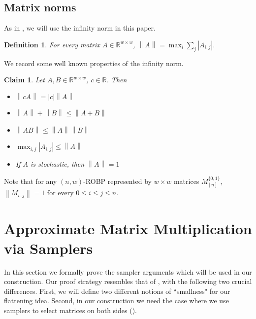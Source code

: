 \documentclass[10pt,a4paper]{article}
\newtheorem{definition}[theorem]{Definition}
\newtheorem{claim}[theorem]{Claim}
\newcommand{\norm}[2][]{\left\|#2\right\|_{#1}}
\newcommand{\bbR}{\mathbb R}
\newcommand{\bit}{\{0,1\}}
\newcommand{\ninf}{\norm}
\begin{document}
\subsection{Matrix norms}
As in \cite{BCG18}, we will use the infinity norm in this paper.
\begin{definition}
For every matrix $A\in\bbR^{w\times w}$, $\ninf{A}=\max_i{\sum_j |A_{i,j}|}$.
\end{definition}
We record some well known properties of the infinity norm.
\begin{claim}
Let $A,B\in\bbR^{w\times w}$, $c\in \bbR$. Then
\begin{itemize}
\item
$\norm{cA}=|c|\norm{A}$
\item
$\norm{A}+\norm{B}\le\norm{A+B}$
\item
$\ninf{AB}\le \ninf{A}\ninf{B}$ 
\item
 $\max_{i,j} |A_{i,j}|\le\ninf{A}$
\item
If $A$ is stochastic, then $\ninf{A}=1$
\end{itemize}
\end{claim}
Note that for any $(n,w)$-ROBP represented by $w\times w$ matrices $M_{[n]}^{\bit}$, $\ninf{M_{i..j}}=1$ for every $0\le i\le j\le n$.


\section{Approximate Matrix Multiplication via Samplers}\label{sec:samp-our}




In this section we formally prove the sampler arguments which will be used in our construction. Our proof strategy resembles that of \cite{BCG18},  with the following two crucial differences. First, we will define two different notions of ``smallness" for our flattening idea. Second, in our construction we need the case where we use samplers to select matrices on both sides (). 
\end{document}
